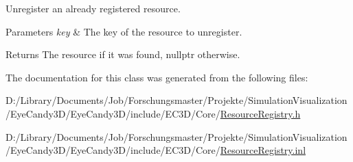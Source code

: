 Unregister an already registered resource. 


\begin{DoxyParams}{Parameters}
{\em key} & The key of the resource to unregister. \\
\hline
\end{DoxyParams}
\begin{DoxyReturn}{Returns}
The resource if it was found, nullptr otherwise. 
\end{DoxyReturn}


The documentation for this class was generated from the following files\+:\begin{DoxyCompactItemize}
\item 
D\+:/\+Library/\+Documents/\+Job/\+Forschungsmaster/\+Projekte/\+Simulation\+Visualization/\+Eye\+Candy3\+D/\+Eye\+Candy3\+D/include/\+E\+C3\+D/\+Core/\mbox{\hyperlink{_resource_registry_8h}{Resource\+Registry.\+h}}\item 
D\+:/\+Library/\+Documents/\+Job/\+Forschungsmaster/\+Projekte/\+Simulation\+Visualization/\+Eye\+Candy3\+D/\+Eye\+Candy3\+D/include/\+E\+C3\+D/\+Core/\mbox{\hyperlink{_resource_registry_8inl}{Resource\+Registry.\+inl}}\end{DoxyCompactItemize}
